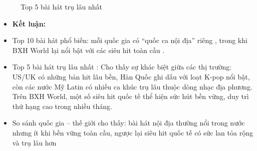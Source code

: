 \begin{itemize}
\begin{figure}[H]
        \caption{Top 5 bài hát trụ lâu nhất}
         \label{fig:energy-regions}

     \end{figure}

        


      
    
   

         \begin{itemize}
             \item \textbf{Kết luận: }
             \item Top 10 bài hát phổ biến: mỗi quốc gia có “quốc ca nội địa” riêng , trong khi BXH World lại nổi bật với các siêu hit toàn cầu .
             
             \item  Top 5 bài hát trụ lâu nhất : Cho thấy sự khác biệt giữa các thị trường: US/UK có những bản hit lâu bền, Hàn Quốc ghi dấu với loạt K-pop nổi bật, còn các nước Mỹ Latin có nhiều ca khúc trụ lâu thuộc dòng nhạc địa phương. Trên BXH World, một số siêu hit quốc tế  thể hiện sức hút bền vững, duy trì thứ hạng cao trong nhiều tháng.

             
             \item So sánh quốc gia – thế giới cho thấy: bài hát nội địa thường nổi trong nước nhưng ít khi bền vững toàn cầu, ngược lại siêu hit quốc tế có sức lan tỏa rộng và trụ lâu hơn

             
         \end{itemize}
\end{itemize}





